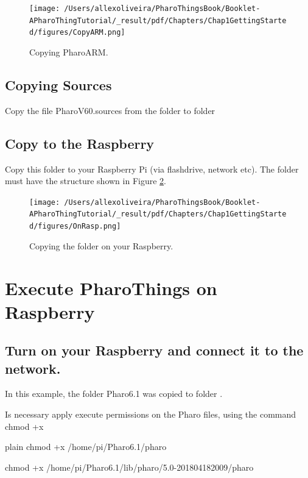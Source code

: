 \documentclass[10pt,twoside,english]{_support/latex/sbabook/sbabook}
\begin{document}
\begin{figure}

\begin{center}
\texttt{[image: /Users/allexoliveira/PharoThingsBook/Booklet-APharoThingTutorial/\_result/pdf/Chapters/Chap1GettingStarted/figures/CopyARM.png]}\caption{Copying PharoARM.\label{CopyARM}}\end{center}
\end{figure}

\subsection{Copying Sources}
Copy the file PharoV60.sources from the folder  to folder 
\subsection{Copy to the Raspberry}
Copy this folder to your Raspberry Pi (via flashdrive, network etc). The folder must have the structure shown in Figure \ref{OnRasp}.


\begin{figure}

\begin{center}
\texttt{[image: /Users/allexoliveira/PharoThingsBook/Booklet-APharoThingTutorial/\_result/pdf/Chapters/Chap1GettingStarted/figures/OnRasp.png]}\caption{Copying the folder on your Raspberry.\label{OnRasp}}\end{center}
\end{figure}

\section{Execute PharoThings on Raspberry}\subsection{Turn on your Raspberry and connect it to the network.}
In this example, the folder Pharo6.1 was copied to folder .

Is necessary apply execute permissions on the Pharo files, using the command chmod +x

\begin{displaycode}{plain}
chmod +x /home/pi/Pharo6.1/pharo

chmod +x /home/pi/Pharo6.1/lib/pharo/5.0-201804182009/pharo
\end{displaycode}
\end{document}
